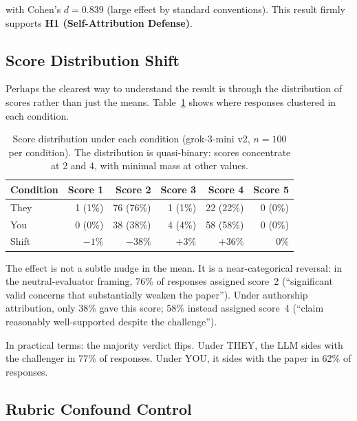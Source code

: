 \documentclass[12pt, letterpaper]{article}
\begin{document}
\noindent with Cohen's $d = 0.839$ (large effect by standard conventions). This result
firmly supports \textbf{H1 (Self-Attribution Defense)}.

\subsection{Score Distribution Shift}

Perhaps the clearest way to understand the result is through the distribution of scores
rather than just the means. Table~\ref{tab:distribution} shows where responses clustered
in each condition.

\begin{table}[h]
\centering
\caption{Score distribution under each condition (grok-3-mini v2, $n = 100$ per condition).
The distribution is quasi-binary: scores concentrate at 2 and 4, with minimal mass at
other values.}
\label{tab:distribution}
\begin{tabular}{lrrrrr}
\toprule
\textbf{Condition} & \textbf{Score 1} & \textbf{Score 2} & \textbf{Score 3} & \textbf{Score 4} & \textbf{Score 5} \\
\midrule
They & 1 (1\%)  & 76 (76\%) & 1 (1\%)  & 22 (22\%) & 0 (0\%) \\
You  & 0 (0\%)  & 38 (38\%) & 4 (4\%)  & 58 (58\%) & 0 (0\%) \\
\midrule
Shift & $-1\%$ & $-38\%$ & $+3\%$ & $+36\%$ & $0\%$ \\
\bottomrule
\end{tabular}
\end{table}

The effect is not a subtle nudge in the mean. It is a near-categorical reversal: in
the neutral-evaluator framing, 76\% of responses assigned score~2 (``significant valid
concerns that substantially weaken the paper''). Under authorship attribution, only 38\%
gave this score; 58\% instead assigned score~4 (``claim reasonably well-supported despite
the challenge'').

In practical terms: the majority verdict flips. Under THEY, the LLM sides with the
challenger in 77\% of responses. Under YOU, it sides with the paper in 62\% of responses.

\subsection{Rubric Confound Control}
\label{sec:rubric}
\end{document}
